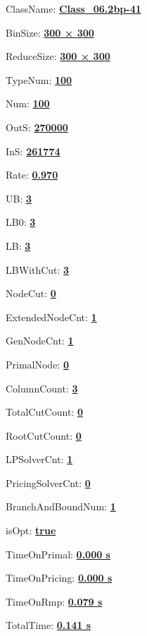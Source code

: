 \documentclass[11pt]{article}
\begin{document}
\pagestyle{empty}


ClassName: \underline{\textbf{Class_06.2bp-41}}
\par
BinSize: \underline{\textbf{300 × 300}}
\par
ReduceSize: \underline{\textbf{300 × 300}}
\par
TypeNum: \underline{\textbf{100}}
\par
Num: \underline{\textbf{100}}
\par
OutS: \underline{\textbf{270000}}
\par
InS: \underline{\textbf{261774}}
\par
Rate: \underline{\textbf{0.970}}
\par
UB: \underline{\textbf{3}}
\par
LB0: \underline{\textbf{3}}
\par
LB: \underline{\textbf{3}}
\par
LBWithCut: \underline{\textbf{3}}
\par
NodeCut: \underline{\textbf{0}}
\par
ExtendedNodeCnt: \underline{\textbf{1}}
\par
GenNodeCnt: \underline{\textbf{1}}
\par
PrimalNode: \underline{\textbf{0}}
\par
ColumnCount: \underline{\textbf{3}}
\par
TotalCutCount: \underline{\textbf{0}}
\par
RootCutCount: \underline{\textbf{0}}
\par
LPSolverCnt: \underline{\textbf{1}}
\par
PricingSolverCnt: \underline{\textbf{0}}
\par
BranchAndBoundNum: \underline{\textbf{1}}
\par
isOpt: \underline{\textbf{true}}
\par
TimeOnPrimal: \underline{\textbf{0.000 s}}
\par
TimeOnPricing: \underline{\textbf{0.000 s}}
\par
TimeOnRmp: \underline{\textbf{0.079 s}}
\par
TotalTime: \underline{\textbf{0.141 s}}
\par
\newpage
\end{document}
